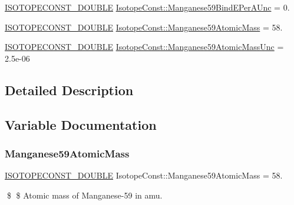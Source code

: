 \begin{DoxyCompactItemize}
\mbox{\hyperlink{group___isotope_const-_macros_ga8f45a7272ce02c0b4c65c44636ed719a}{I\+S\+O\+T\+O\+P\+E\+C\+O\+N\+S\+T\+\_\+\+D\+O\+U\+B\+LE}} \mbox{\hyperlink{group___isotope_const-_manganese-_mn59_gad9f6e64d7abe0fdd0b02a13fef729bcf}{Isotope\+Const\+::\+Manganese59\+Bind\+E\+Per\+A\+Unc}} = 0.
\item 
\mbox{\hyperlink{group___isotope_const-_macros_ga8f45a7272ce02c0b4c65c44636ed719a}{I\+S\+O\+T\+O\+P\+E\+C\+O\+N\+S\+T\+\_\+\+D\+O\+U\+B\+LE}} \mbox{\hyperlink{group___isotope_const-_manganese-_mn59_ga898d2edaad5564fdb315d6485521eb96}{Isotope\+Const\+::\+Manganese59\+Atomic\+Mass}} = 58.
\item 
\mbox{\hyperlink{group___isotope_const-_macros_ga8f45a7272ce02c0b4c65c44636ed719a}{I\+S\+O\+T\+O\+P\+E\+C\+O\+N\+S\+T\+\_\+\+D\+O\+U\+B\+LE}} \mbox{\hyperlink{group___isotope_const-_manganese-_mn59_ga735e57fd5b3f72fbb0ae01389ea7ca14}{Isotope\+Const\+::\+Manganese59\+Atomic\+Mass\+Unc}} = 2.\+5e-\/06
\end{DoxyCompactItemize}


\subsection{Detailed Description}


\subsection{Variable Documentation}
\mbox{\label{group___isotope_const-_manganese-_mn59_ga898d2edaad5564fdb315d6485521eb96}} 
\subsubsection{\texorpdfstring{Manganese59\+Atomic\+Mass}{Manganese59AtomicMass}}
{\footnotesize\ttfamily \mbox{\hyperlink{group___isotope_const-_macros_ga8f45a7272ce02c0b4c65c44636ed719a}{I\+S\+O\+T\+O\+P\+E\+C\+O\+N\+S\+T\+\_\+\+D\+O\+U\+B\+LE}} Isotope\+Const\+::\+Manganese59\+Atomic\+Mass = 58.}

\$ \$ Atomic mass of Manganese-\/59 in amu. \mbox{\label{group___isotope_const-_manganese-_mn59_ga735e57fd5b3f72fbb0ae01389ea7ca14}} 

